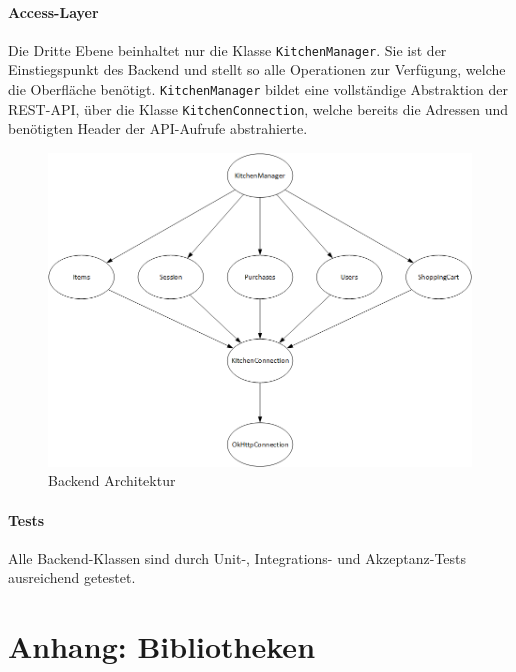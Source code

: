 \documentclass{scrartcl}
\begin{document}
	\paragraph*{Access-Layer}
	Die Dritte Ebene beinhaltet nur die Klasse \texttt{KitchenManager}.
	Sie ist der Einstiegspunkt des Backend und stellt so alle Operationen zur Verfügung, welche die Oberfläche benötigt. \texttt{KitchenManager} bildet eine vollständige Abstraktion der REST-API, über die Klasse \texttt{KitchenConnection}, welche bereits die Adressen und benötigten Header der API-Aufrufe abstrahierte.

	\begin{figure}[!h]
		\centering
		\includegraphics[scale=0.5]{./figures/classStructure.png}
		\caption{Backend Architektur}
		\label{backendArchitecture}
	\end{figure}

	\paragraph*{Tests}
	Alle Backend-Klassen sind durch Unit-, Integrations- und Akzeptanz-Tests ausreichend getestet.

	\section{Anhang: Bibliotheken}\label{sec:bib}
\end{document}
